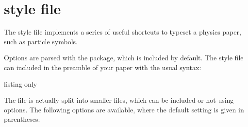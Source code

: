\section{ style file}
\label{sec:atlasphysics}

The  style file implements a series of useful
shortcuts to typeset a physics paper, such as particle
symbols.

Options are parsed with the  package, which is included by default.
The style file can included in the preamble of your paper with the usual
syntax:
%
\begin{tcblisting}{listing only}
\usepackage{atlasphysics}
\end{tcblisting}
%
The file is actually split into smaller files,
which can be included or not using options.
The following options are available, where the default setting is given in parentheses:
